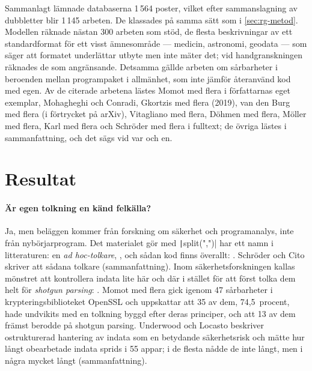Sammanlagt lämnade databaserna 1\,564 poster, vilket efter
sammanslagning av dubbletter blir 1\,145 arbeten.  De klassades på samma
sätt som i \cref{sec:rg-metod}.  Modellen räknade nästan 300 arbeten som
stöd, de flesta beskrivningar av ett standardformat för ett visst
ämnesområde --- medicin, astronomi, geodata --- som säger att formatet
underlättar utbyte men inte mäter det; vid handgranskningen räknades de
som angränsande.  Detsamma gällde arbeten om sårbarheter i beroenden
mellan programpaket i allmänhet, som inte jämför återanvänd kod med egen.
Av de citerade arbetena lästes Momot med flera i författarnas eget
exemplar, Mohagheghi och Conradi, Gkortzis med flera (2019), van den
Burg med flera (i förtrycket på arXiv), Vitagliano med flera, Döhmen med flera, Möller med
flera, Karl med flera och Schröder med flera i fulltext; de övriga
lästes i sammanfattning, och det sägs vid var och en.

\section{Resultat}
\label{sec:sf-resultat}

\paragraph{Är egen tolkning en känd felkälla?}  Ja, men beläggen kommer
från forskning om säkerhet och programanalys, inte från nybörjarprogram.
Det materialet gör med \texttt|split(",")| har ett namn i
litteraturen: en \emph{ad hoc-tolkare}, , och sådan kod
finns överallt: .  Schröder och Cito skriver att
sådana tolkare 
(sammanfattning).  Inom säkerhetsforskningen kallas mönstret att
kontrollera indata lite här och där i stället för att först tolka dem
helt för \emph{shotgun parsing}: .  Momot med flera gick
igenom 47 sårbarheter i krypteringsbiblioteket OpenSSL och uppskattar
att 35 av dem, 74,5~procent, hade undvikits med en tolkning byggd efter
deras principer, och att 13 av dem främst berodde på shotgun
parsing\autocite{Momot2016Turrets}.  Underwood och Locasto beskriver
ostrukturerad hantering av indata som en betydande säkerhetsrisk och
mätte hur långt obearbetade indata sprids i 55 appar; i de flesta nådde
de inte långt, men i några mycket långt\autocite{Underwood2016Shotgun}
(sammanfattning).

